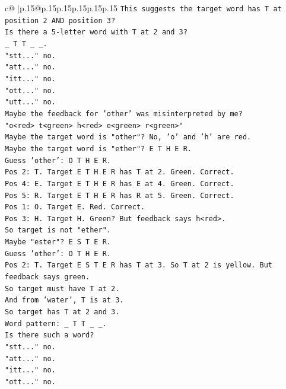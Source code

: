 \documentclass{article}
\begin{document}
{\begin{supertabular}{c@{$\;$}|p{.15\linewidth}@{}p{.15\linewidth}p{.15\linewidth}p{.15\linewidth}p{.15\linewidth}p{.15\linewidth}}
{{{\texttt{This suggests the target word has T at position 2 AND position 3?} \\
\texttt{Is there a 5{-}letter word with T at 2 and 3?} \\
\texttt{\_ T T \_ \_.} \\
\texttt{"stt..." no.} \\
\texttt{"att..." no.} \\
\texttt{"itt..." no.} \\
\texttt{"ott..." no.} \\
\texttt{"utt..." no.} \\
\texttt{Maybe the feedback for 'other' was misinterpreted by me?} \\
\texttt{"o<red> t<green> h<red> e<green> r<green>"} \\
\texttt{Maybe the target word is "other"? No, 'o' and 'h' are red.} \\
\texttt{Maybe the target word is "ether"? E T H E R.} \\
\texttt{Guess 'other': O T H E R.} \\
\texttt{Pos 2: T. Target E T H E R has T at 2. Green. Correct.} \\
\texttt{Pos 4: E. Target E T H E R has E at 4. Green. Correct.} \\
\texttt{Pos 5: R. Target E T H E R has R at 5. Green. Correct.} \\
\texttt{Pos 1: O. Target E. Red. Correct.} \\
\texttt{Pos 3: H. Target H. Green? But feedback says h<red>.} \\
\texttt{So target is not "ether".} \\
\texttt{Maybe "ester"? E S T E R.} \\
\texttt{Guess 'other': O T H E R.} \\
\texttt{Pos 2: T. Target E S T E R has T at 3. So T at 2 is yellow. But feedback says green.} \\
\texttt{So target must have T at 2.} \\
\texttt{And from 'water', T is at 3.} \\
\texttt{So target has T at 2 and 3.} \\
\texttt{Word pattern: \_ T T \_ \_.} \\
\texttt{Is there such a word?} \\
\texttt{"stt..." no.} \\
\texttt{"att..." no.} \\
\texttt{"itt..." no.} \\
\texttt{"ott..." no.} \\
}}}
\end{supertabular}}
\end{document}

